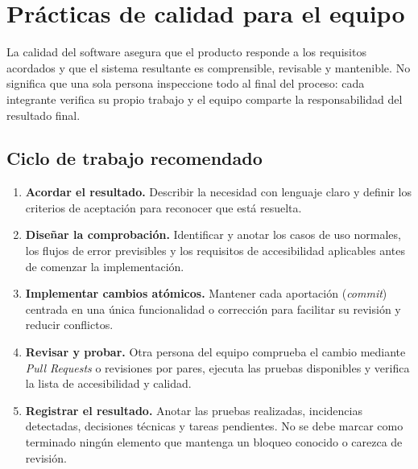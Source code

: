 \section{Prácticas de calidad para el equipo}

La calidad del software asegura que el producto responde a los requisitos acordados y que el sistema resultante es comprensible, revisable y mantenible. No significa que una sola persona inspeccione todo al final del proceso: cada integrante verifica su propio trabajo y el equipo comparte la responsabilidad del resultado final.

\subsection{Ciclo de trabajo recomendado}
\begin{enumerate}[leftmargin=*]
  \item \textbf{Acordar el resultado.} Describir la necesidad con lenguaje claro y definir los criterios de aceptación para reconocer que está resuelta.
  \item \textbf{Diseñar la comprobación.} Identificar y anotar los casos de uso normales, los flujos de error previsibles y los requisitos de accesibilidad aplicables antes de comenzar la implementación.
  \item \textbf{Implementar cambios atómicos.} Mantener cada aportación (\textit{commit}) centrada en una única funcionalidad o corrección para facilitar su revisión y reducir conflictos.
  \item \textbf{Revisar y probar.} Otra persona del equipo comprueba el cambio mediante \textit{Pull Requests} o revisiones por pares, ejecuta las pruebas disponibles y verifica la lista de accesibilidad y calidad.
  \item \textbf{Registrar el resultado.} Anotar las pruebas realizadas, incidencias detectadas, decisiones técnicas y tareas pendientes. No se debe marcar como terminado ningún elemento que mantenga un bloqueo conocido o carezca de revisión.
\end{enumerate}

